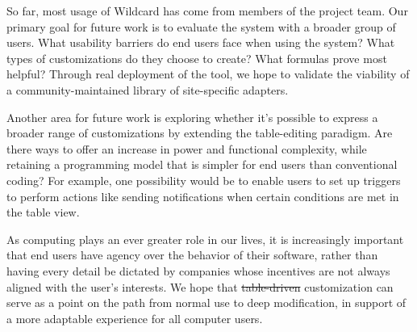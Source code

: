 \documentclass[sigplan,screen,10pt,anonymous,review]{acmart}
\providecommand{\DIFadd}[1]{{\protect\color{blue}\uwave{#1}}} %
\providecommand{\DIFdel}[1]{{\protect\color{red}\sout{#1}}}                      %
\providecommand{\DIFaddbegin}{} %
\providecommand{\DIFaddend}{} %
\providecommand{\DIFdelbegin}{} %
\providecommand{\DIFdelend}{} %
\begin{document}
So far, most usage of Wildcard has come from members of the project
team. Our primary goal for future work is to evaluate the system with a
broader group of users. What usability barriers do end users face when
using the system? What types of customizations do they choose to create?
What formulas prove most helpful? Through real deployment of the tool,
we hope to validate the viability of a community-maintained library of
site-specific adapters.

Another area for future work is exploring whether it's possible to
express a broader range of customizations by extending the table-editing
paradigm. Are there ways to offer an increase in power and functional
complexity, while retaining a programming model that is simpler for end
users than conventional coding? For example, one possibility would be to
enable users to set up triggers to perform actions like sending
notifications when certain conditions are met in the table view.

As computing plays an ever greater role in our lives, it is increasingly
important that end users have agency over the behavior of their
software, rather than having every detail be dictated by companies whose
incentives are not always aligned with the user's interests. We hope
that \DIFdelbegin \DIFdel{table-driven }\DIFdelend \DIFaddbegin \DIFadd{data-driven }\DIFaddend customization can serve as a point on the path from
normal use to deep modification, in support of a more adaptable
experience for all computer users.



\end{document}
